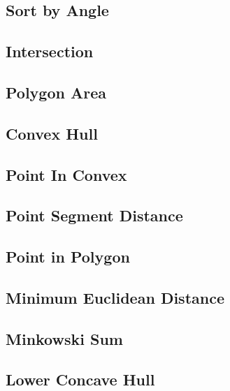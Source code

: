 \documentclass[a4paper,10pt,twocolumn,oneside,x11names]{article}
\begin{document}
\subsection{Sort by Angle}


\subsection{Intersection}


\subsection{Polygon Area}


\subsection{Convex Hull}


\subsection{Point In Convex}


\subsection{Point Segment Distance}


\subsection{Point in Polygon}


\subsection{Minimum Euclidean Distance}


\subsection{Minkowski Sum}


\subsection{Lower Concave Hull}

\end{document}
